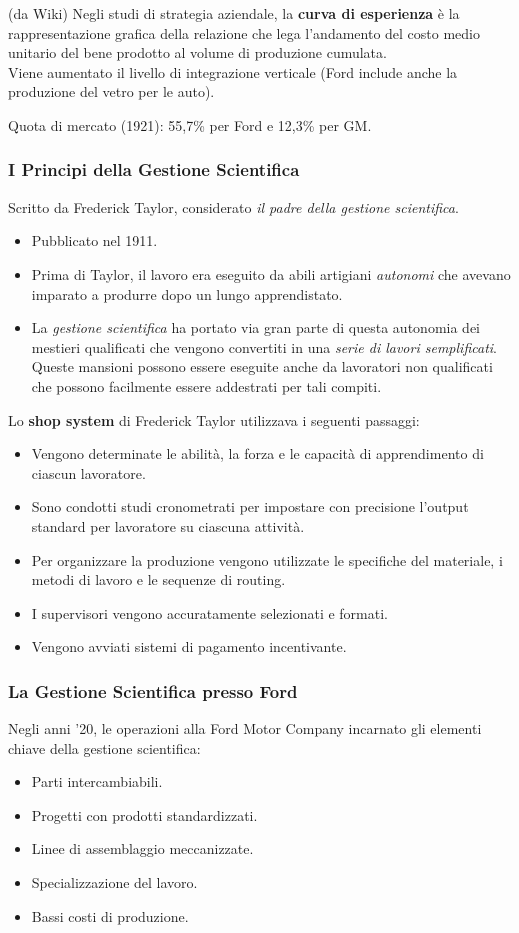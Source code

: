 \documentclass[a4paper,portrait,12pt]{article}
\theoremstyle{definition}
\begin{document}
(da Wiki) Negli studi di strategia aziendale, la \textbf{curva di esperienza} è la rappresentazione grafica della relazione che lega l'andamento del costo medio unitario del bene prodotto al volume di produzione cumulata.\\

Viene aumentato il livello di integrazione verticale (Ford include anche la produzione del vetro per le auto).

Quota di mercato (1921): 55,7\% per Ford e 12,3\% per GM.

\subsubsection{I Principi della Gestione Scientifica}
Scritto da Frederick Taylor, considerato \emph{il padre della gestione scientifica}.
\begin{itemize}
\item Pubblicato nel 1911.
\item Prima di Taylor, il lavoro era eseguito da abili artigiani \emph{autonomi} che avevano imparato a produrre dopo un lungo apprendistato.
\item La \emph{gestione scientifica} ha portato via gran parte di questa autonomia dei mestieri qualificati che vengono convertiti in una \emph{serie di lavori semplificati}.
Queste mansioni possono essere eseguite anche da lavoratori non qualificati che possono facilmente essere addestrati per tali compiti.
\end{itemize}

\noindent
Lo \textbf{shop system} di Frederick Taylor utilizzava i seguenti passaggi:
\begin{itemize}
\item Vengono determinate le abilità, la forza e le capacità di apprendimento di ciascun lavoratore.
\item Sono condotti studi cronometrati per impostare con precisione l'output standard per lavoratore su ciascuna attività.
\item Per organizzare la produzione vengono utilizzate le specifiche del materiale, i metodi di lavoro e le sequenze di routing.
\item I supervisori vengono accuratamente selezionati e formati.
\item Vengono avviati sistemi di pagamento incentivante.
\end{itemize}

\subsubsection{La Gestione Scientifica presso Ford}
Negli anni '20, le operazioni alla Ford Motor Company incarnato gli elementi chiave della gestione scientifica:
\begin{itemize}
\item Parti intercambiabili.
\item Progetti con prodotti standardizzati.
\item Linee di assemblaggio meccanizzate.
\item Specializzazione del lavoro.
\item Bassi costi di produzione.
\end{itemize}
\end{document}

